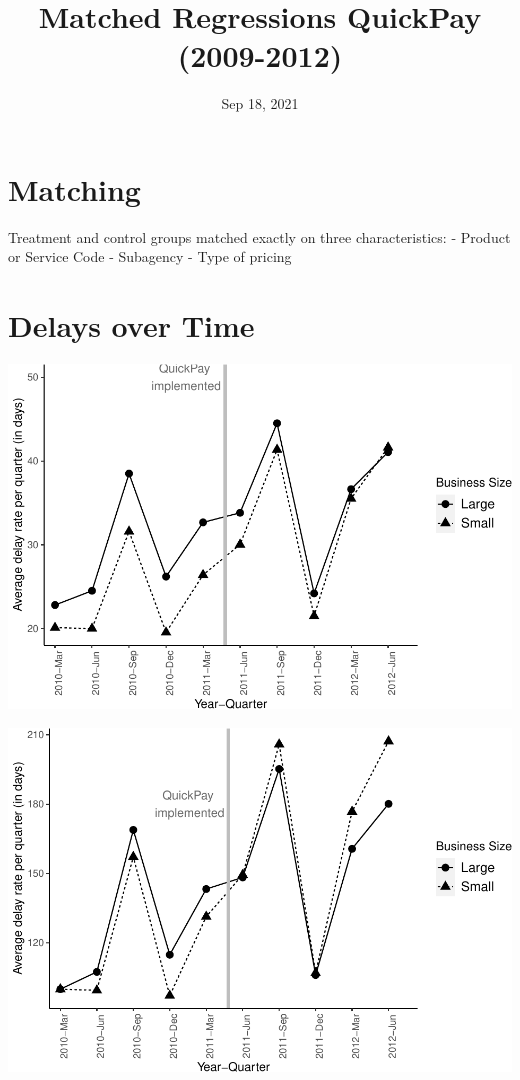 \documentclass[
]{article}
\title{Matched Regressions QuickPay (2009-2012)}
\author{}
\date{\vspace{-2.5em}Sep 18, 2021}
\begin{document}
\maketitle

\hypertarget{matching}{%
\section{Matching}\label{matching}}

Treatment and control groups matched exactly on three characteristics: -
Product or Service Code - Subagency - Type of pricing

\hypertarget{delays-over-time}{%
\section{Delays over Time}\label{delays-over-time}}

\includegraphics{qp_first_matched_files/figure-latex/plot-1.pdf}

\includegraphics{qp_first_matched_files/figure-latex/normalized_plot-1.pdf}
\end{document}
